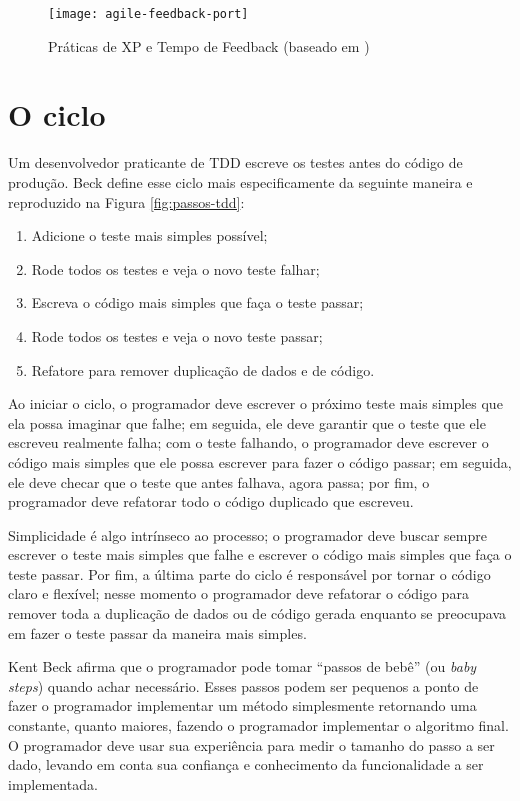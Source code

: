 \begin{figure}
  \centering
  \texttt{[image: agile-feedback-port]}
  \caption{Práticas de XP e Tempo de Feedback (baseado em \cite{vanderburg})}
  \label{fig:agile-feedback}
\end{figure}

\section{O ciclo}

Um desenvolvedor praticante de TDD escreve os testes antes do código de
produção. Beck define esse ciclo mais especificamente da seguinte maneira
\cite{TDDByExample} e reproduzido na Figura \ref{fig:passos-tdd}:

\begin{enumerate}
	\item Adicione o teste mais simples possível; 
	\item Rode todos os testes e veja o novo teste falhar; 
	\item Escreva o código mais simples que faça o teste passar; 
	\item Rode todos os testes e veja o novo teste passar; 
	\item Refatore para remover duplicação de dados e de código.
\end{enumerate}

Ao iniciar o ciclo, o programador deve escrever o próximo teste mais simples que
ela possa imaginar que falhe; em seguida, ele deve garantir que o teste que ele
escreveu realmente falha; com o teste falhando, o programador deve escrever o
código mais simples que ele possa escrever para fazer o código passar; em
seguida, ele deve checar que o teste que antes falhava, agora passa; por fim, o
programador deve refatorar todo o código duplicado que escreveu.

Simplicidade é algo intrínseco ao processo; o programador deve
buscar sempre escrever o teste mais simples que falhe e escrever o código mais simples
que faça o teste passar. Por fim, a última parte do ciclo é responsável por
tornar o código claro e flexível; nesse momento o programador deve
refatorar o código para remover toda a duplicação de dados ou de código gerada enquanto 
se preocupava em fazer o teste passar da maneira mais simples.

Kent Beck \cite{TDDByExample} afirma que o programador pode tomar
``passos de bebê'' (ou \textit{baby steps}) quando achar necessário. Esses
passos podem ser pequenos a ponto de fazer o programador implementar um método
simplesmente retornando uma constante, quanto maiores, fazendo o programador
implementar o algoritmo final. O programador deve usar sua experiência para
medir o tamanho do passo a ser dado, levando em conta sua confiança e
conhecimento da funcionalidade a ser implementada.


